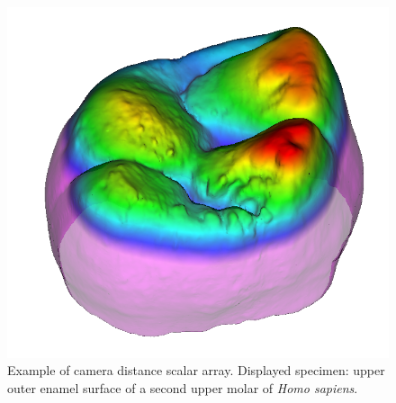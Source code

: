 \begin{figure}
  \centering
  \includegraphics[scale=0.38]{images/11/camera_distance_example.png} 
	\caption{
Example of camera distance scalar array. Displayed specimen: upper outer enamel surface of a second upper molar of \textit{Homo sapiens}.}
\label{camera_distance}
 
\end{figure}
\noindent


\noindent



